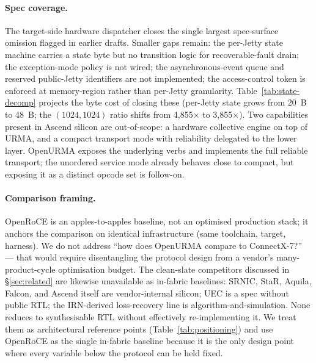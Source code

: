 \documentclass[10pt,twocolumn]{article}
\begin{document}
\paragraph{Spec coverage.}
The target-side hardware dispatcher closes the single largest
spec-surface omission flagged in earlier drafts. Smaller gaps
remain: the per-Jetty state machine carries a state byte but no
transition logic for recoverable-fault drain; the exception-mode
policy is not wired; the asynchronous-event queue and reserved
public-Jetty identifiers are not implemented; the access-control
token is enforced at memory-region rather than per-Jetty
granularity. Table~\ref{tab:state-decomp} projects the byte cost
of closing these (per-Jetty state grows from 20~B to 48~B; the
$(1024,1024)$ ratio shifts from 4{,}855$\times$ to
3{,}855$\times$). Two capabilities present in Ascend silicon are
out-of-scope: a hardware collective engine on top of URMA, and a
compact transport mode with reliability delegated to the lower
layer. OpenURMA exposes the underlying verbs and implements the
full reliable transport; the unordered service mode already
behaves close to compact, but exposing it as a distinct opcode
set is follow-on.

\paragraph{Comparison framing.}
OpenRoCE is an apples-to-apples baseline, not an optimised
production stack; it anchors the comparison on identical
infrastructure (same toolchain, target, harness). We do not
address ``how does OpenURMA compare to ConnectX-7?'' --- that
would require disentangling the protocol design from a vendor's
many-product-cycle optimisation budget. The clean-slate
competitors discussed in \S\ref{sec:related} are likewise
unavailable as in-fabric baselines: SRNIC, StaR, Aquila, Falcon,
and Ascend itself are vendor-internal silicon; UEC is a spec
without public RTL; the IRN-derived loss-recovery line is
algorithm-and-simulation. None reduces to synthesisable RTL
without effectively re-implementing it. We treat them as
architectural reference points (Table~\ref{tab:positioning}) and
use OpenRoCE as the single in-fabric baseline because it is the
only design point where every variable below the protocol can be
held fixed.
\end{document}
